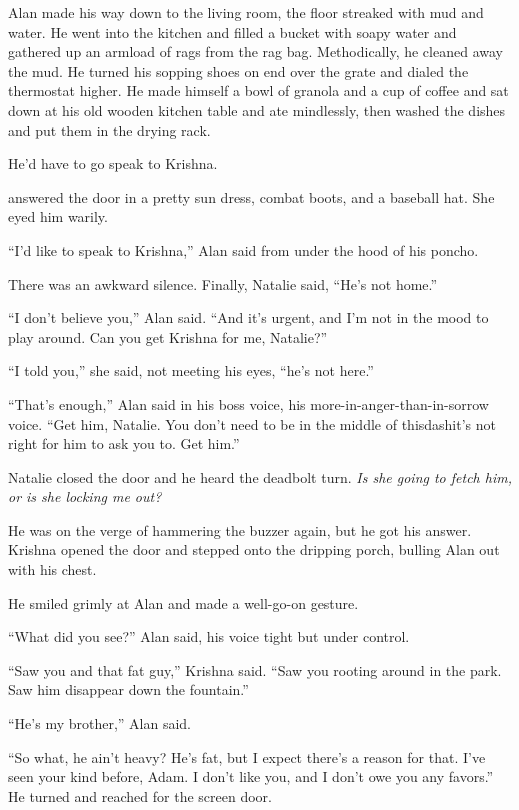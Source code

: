 Alan made his way down to the living room, the floor streaked with mud
and water.  He went into the kitchen and filled a bucket with soapy
water and gathered up an armload of rags from the rag bag. 
Methodically, he cleaned away the mud.  He turned his sopping shoes on
end over the grate and dialed the thermostat higher.  He made himself
a bowl of granola and a cup of coffee and sat down at his old wooden
kitchen table and ate mindlessly, then washed the dishes and put them
in the drying rack.

He'd have to go speak to Krishna.

 answered the door in a pretty sun dress, combat boots, and a
baseball hat.  She eyed him warily.

``I'd like to speak to Krishna,'' Alan said from under the hood of his
poncho.

There was an awkward silence.  Finally, Natalie said, ``He's not
home.''

``I don't believe you,'' Alan said.  ``And it's urgent, and I'm not in
the mood to play around.  Can you get Krishna for me, Natalie?''

``I told you,'' she said, not meeting his eyes, ``he's not here.''

``That's enough,'' Alan said in his boss voice, his
more-in-anger-than-in-sorrow voice.  ``Get him, Natalie.  You don't
need to be in the middle of thisdash{}it's not right for him to ask you
to.  Get him.''

Natalie closed the door and he heard the deadbolt turn.  \textit{Is
she going to fetch him, or is she locking me out?}

He was on the verge of hammering the buzzer again, but he got his
answer.  Krishna opened the door and stepped onto the dripping porch,
bulling Alan out with his chest.

He smiled grimly at Alan and made a well-go-on gesture.

``What did you see?'' Alan said, his voice tight but under control.

``Saw you and that fat guy,'' Krishna said.  ``Saw you rooting around
in the park.  Saw him disappear down the fountain.''

``He's my brother,'' Alan said.

``So what, he ain't heavy?  He's fat, but I expect there's a reason
for that.  I've seen your kind before, Adam.  I don't like you, and I
don't owe you any favors.'' He turned and reached for the screen door.

